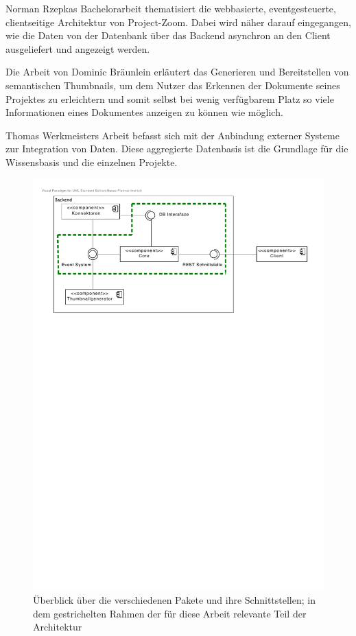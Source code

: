Norman Rzepkas Bachelorarbeit \cite{bp-norman} thematisiert die webbasierte, eventgesteuerte, clientseitige Architektur von Project-Zoom. Dabei wird näher darauf eingegangen, wie die Daten von der Datenbank über das Backend asynchron an den Client ausgeliefert und angezeigt werden.

Die Arbeit von Dominic Bräunlein \cite{bp-dome} erläutert das Generieren und Bereitstellen von semantischen \gls{Thumbnails}, um dem Nutzer das Erkennen der Dokumente seines Projektes zu erleichtern und somit selbst bei wenig verfügbarem Platz so viele Informationen eines Dokumentes anzeigen zu können wie möglich. 

Thomas Werkmeisters Arbeit \cite{bp-tewe} befasst sich mit der Anbindung externer Systeme zur Integration von Daten. Diese aggregierte Datenbasis ist die Grundlage für die Wissensbasis und die einzelnen Projekte.

\begin{figure}[ht]  
  \centering     
  \includegraphics[width=1.0\textwidth]{img/architecture_overview.pdf}  
   \caption{Überblick über die verschiedenen Pakete und ihre Schnittstellen; in dem gestrichelten Rahmen der für diese Arbeit relevante Teil der Architektur}
  \label{fig:architecture-overview} 
\end{figure}

